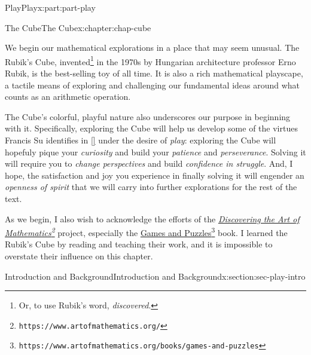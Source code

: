 \documentclass[oneside,10pt,]{book}
\newcommand{\xreffont}{\relax}
\numberwithin{equation}{section}
\begin{document}
\begin{partptx}{Play}{}{Play}{}{}{x:part:part-play}
%
\typeout{************************************************}
\typeout{************************************************}
%
\begin{chapterptx}{The Cube}{}{The Cube}{}{}{x:chapter:chap-cube}
\begin{introduction}{}%
We begin our mathematical explorations in a place that may seem unusual. The Rubik's Cube, invented\footnote{Or, to use Rubik's word, \emph{discovered}.\label{g:fn:idp105544717890576}} in the 1970s by Hungarian architecture professor Erno Rubik, is the best-selling toy of all time. It is also a rich mathematical playscape, a tactile means of exploring and challenging our fundamental ideas around what counts as an arithmetic operation.%
\par
The Cube's colorful, playful nature also underscores our purpose in beginning with it. Specifically, exploring the Cube will help us develop some of the virtues Francis Su identifies in \hyperlink{x:biblio:Su2020}{[{\xreffont 1}]} under the desire of \emph{play}: exploring the Cube will hopefuly pique your \emph{curiosity} and build your \emph{patience} and \emph{perseverance}. Solving it will require you to \emph{change perspectives} and build \emph{confidence in struggle}. And, I hope, the satisfaction and joy you experience in finally solving it will engender an \emph{openness of spirit} that we will carry into further explorations for the rest of the text.%
\par
As we begin, I also wish to acknowledge the efforts of the \emph{\href{https://www.artofmathematics.org/}{Discovering the Art of Mathematics}\footnote{\nolinkurl{https://www.artofmathematics.org/}\label{g:fn:idp105544717895440}}} project, especially the \href{https://www.artofmathematics.org/books/games-and-puzzles}{Games and Puzzles}\footnote{\nolinkurl{https://www.artofmathematics.org/books/games-and-puzzles}\label{g:fn:idp105544717896208}} book. I learned the Rubik's Cube by reading and teaching their work, and it is impossible to overstate their influence on this chapter.%
\end{introduction}%
%
%
\typeout{************************************************}
\typeout{************************************************}
%
\begin{sectionptx}{Introduction and Background}{}{Introduction and Background}{}{}{x:section:sec-play-intro}
\begin{introduction}{}%

\end{introduction}
\end{sectionptx}
\end{chapterptx}
\end{partptx}
\end{document}
